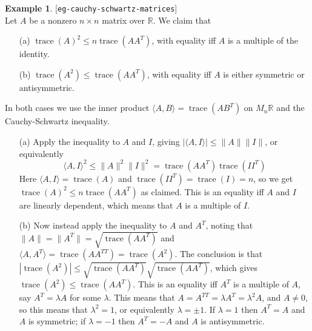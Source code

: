 \documentclass{amsart}
\newcommand{\lbl}[1]{\label{#1}\textup{[\texttt{#1}]}\ \\}
\newcommand{\lbl}{\label}
\newcommand{\R}         {{\mathbb{R}}}
\newcommand{\trc}       {\operatorname{trace}}
\newcommand{\lm}        {\lambda}
\newcommand{\tm}        {\times}
\newcommand{\ip}[1]     {\langle #1\rangle}
\renewcommand{\:}       {\colon}
\theoremstyle{definition}
\newtheorem{example}[theorem]{Example}
\begin{document}
\begin{example}\lbl{eg-cauchy-schwartz-matrices}
  Let $A$ be a nonzero $n\tm n$ matrix over $\R$.  We claim that
 \begin{itemize}
  \item[(a)] $\trc(A)^2\leq n\trc(AA^T)$, with equality iff
   $A$ is a multiple of the identity.
  \item[(b)] $\trc(A^2)\leq\trc(AA^T)$, with equality iff
   $A$ is either symmetric or antisymmetric.
 \end{itemize}
 In both cases we use the inner product
 $\ip{A,B}=\trc(AB^T)$ on $M_n\R$ and the Cauchy-Schwartz
 inequality.  
 \begin{itemize}
  \item[(a)] Apply the inequality to $A$ and $I$, giving
   $|\ip{A,I}|\leq\|A\|\|I\|$, or equivalently 
   \[ \ip{A,I}^2\leq\|A\|^2\|I\|^2=
       \trc(AA^T)\trc(II^T)
   \]
   Here $\ip{A,I}=\trc(A)$ and $\trc(II^T)=\trc(I)=n$, so we
   get $\trc(A)^2\leq n\trc(AA^T)$ as claimed.  This is an
   equality iff $A$ and $I$ are linearly dependent, which
   means that $A$ is a multiple of $I$.
  \item[(b)] Now instead apply the inequality to $A$ and
   $A^T$, noting that $\|A\|=\|A^T\|=\sqrt{\trc(AA^T)}$ and
   $\ip{A,A^T}=\trc(AA^{TT})=\trc(A^2)$.  The conclusion is
   that $|\trc(A^2)|\leq\sqrt{\trc(AA^T)}\sqrt{\trc(AA^T)}$, 
   which gives $\trc(A^2)\leq\trc(AA^T)$.  This is an
   equality iff $A^T$ is a multiple of $A$, say $A^T=\lm A$
   for some $\lm$.  This means that
   $A=A^{TT}=\lm A^T=\lm^2A$, and $A\neq 0$, so this means
   that $\lm^2=1$, or equivalently $\lm=\pm 1$.  If $\lm=1$
   then $A^T=A$ and $A$ is symmetric; if $\lm=-1$ then
   $A^T=-A$ and $A$ is antisymmetric.
 \end{itemize}

\end{example}
\end{document}
